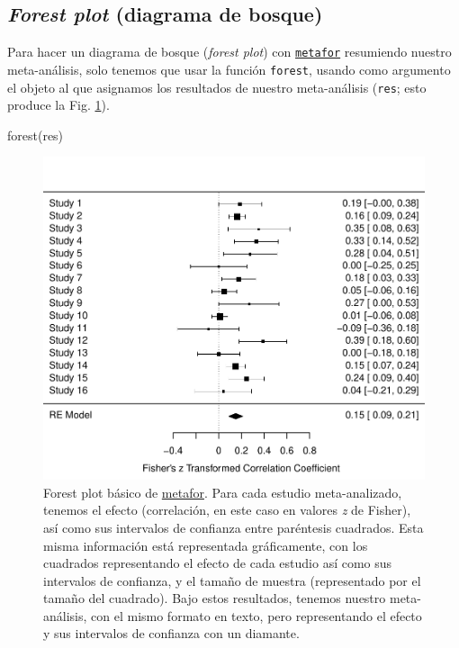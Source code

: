\documentclass[
  bookmarksnumbered]{article}
\newenvironment{Shaded}{\begin{snugshade}}{\end{snugshade}}
\newcommand{\FunctionTok}[1]{\textcolor[rgb]{0.39,0.29,0.61}{#1}}
\newcommand{\NormalTok}[1]{\textcolor[rgb]{0.12,0.11,0.11}{#1}}
\begin{document}
\hypertarget{forest-plot-diagrama-de-bosque}{%
\subsection{\texorpdfstring{\emph{Forest plot} (diagrama de bosque)}{Forest plot (diagrama de bosque)}}\label{forest-plot-diagrama-de-bosque}}

Para hacer un diagrama de bosque (\emph{forest plot}) con \href{https://www.metafor-project.org/doku.php}{\texttt{metafor}} resumiendo nuestro meta-análisis, solo tenemos que usar la función \texttt{forest}, usando como argumento el objeto al que asignamos los resultados de nuestro meta-análisis (\texttt{res}; esto produce la Fig. \ref{fig:for-plot1}).

\begin{Shaded}
\begin{Highlighting}[]
\FunctionTok{forest}\NormalTok{(res)}
\end{Highlighting}
\end{Shaded}

\begin{figure}
\centering
\includegraphics{Meta-analysis_files/figure-latex/for-plot1-1.pdf}
\caption{\label{fig:for-plot1}Forest plot básico de \href{https://www.metafor-project.org/doku.php}{metafor}. Para cada estudio meta-analizado, tenemos el efecto (correlación, en este caso en valores \emph{z} de Fisher), así como sus intervalos de confianza entre paréntesis cuadrados. Esta misma información está representada gráficamente, con los cuadrados representando el efecto de cada estudio así como sus intervalos de confianza, y el tamaño de muestra (representado por el tamaño del cuadrado). Bajo estos resultados, tenemos nuestro meta-análisis, con el mismo formato en texto, pero representando el efecto y sus intervalos de confianza con un diamante.}
\end{figure}
\end{document}
